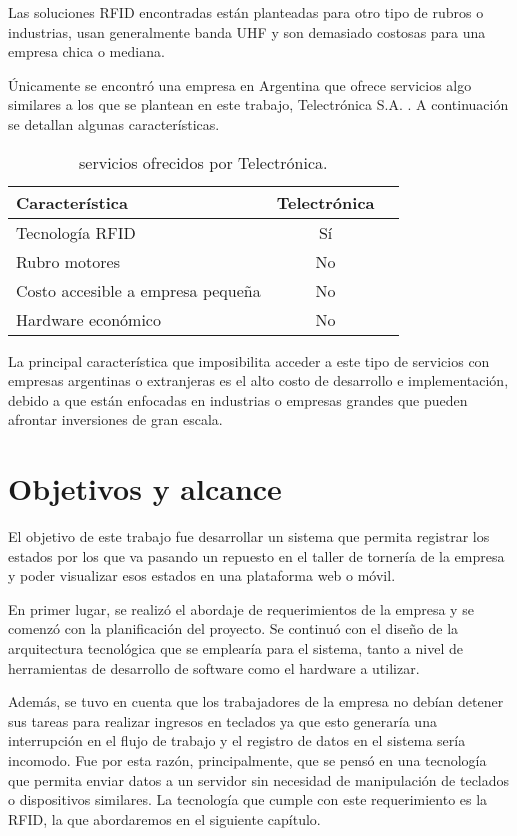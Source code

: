 Las soluciones RFID encontradas están planteadas para otro tipo de rubros o industrias, usan generalmente banda UHF y son demasiado costosas para una empresa chica o mediana. 

Únicamente se encontró una empresa en Argentina que ofrece servicios algo similares a los que se plantean en este trabajo, Telectrónica S.A. \citep{WEBSITE:TELECTRONICA}. A continuación se detallan algunas características.

\begin{table}[h]
	\centering
	\caption[caption corto]{servicios ofrecidos por Telectrónica.}
	\begin{tabular}{l c c}    
		\toprule
		\textbf{Característica} 	 & \textbf{Telectrónica} 		  \\
		\midrule
		Tecnología RFID	 & Sí				 \\
		Rubro motores & No \\		
		Costo accesible a empresa pequeña	 & No				 \\
		Hardware económico	 & No				 \\
		\bottomrule
		\hline
	\end{tabular}
	\label{tab:peces}
\end{table}

La principal característica que imposibilita acceder a este tipo de servicios con empresas argentinas o extranjeras es el alto costo de desarrollo e implementación, debido a que están enfocadas en industrias o empresas grandes que pueden afrontar inversiones de gran escala.



\section{Objetivos y alcance}

El objetivo de este trabajo fue desarrollar un sistema que permita registrar los estados por los que va pasando un repuesto en el taller de tornería de la empresa y poder visualizar esos estados en una plataforma web o móvil. 

En primer lugar, se realizó el abordaje de requerimientos de la empresa y se comenzó con la planificación del proyecto. Se continuó con el diseño de la arquitectura tecnológica que se emplearía para el sistema, tanto a nivel de herramientas de desarrollo de software como el hardware a utilizar.

Además, se tuvo en cuenta que los trabajadores de la empresa no debían detener sus tareas para realizar ingresos en teclados ya que esto generaría una interrupción en el flujo de trabajo y el registro de datos en el sistema sería incomodo. Fue por esta razón, principalmente, que se pensó en una tecnología que permita enviar datos a un servidor sin necesidad de manipulación de teclados o dispositivos similares. La tecnología que cumple con este requerimiento es la RFID, la que abordaremos en el siguiente capítulo.

